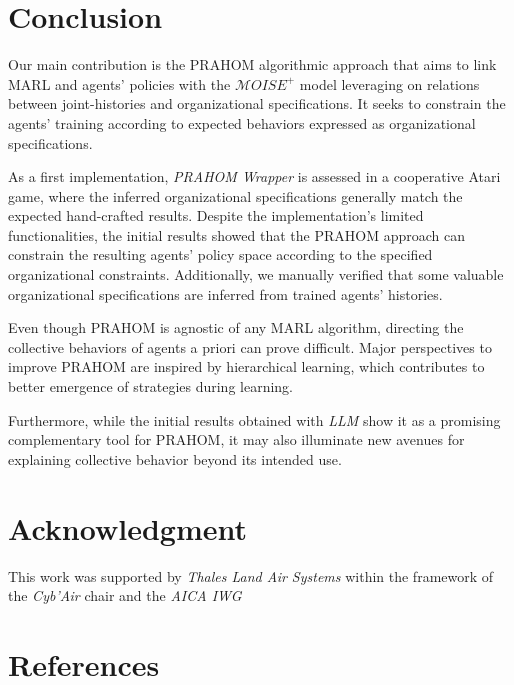 \documentclass[conference]{IEEEtran}
\newcounter{relation}
\begin{document}

\section{Conclusion}

Our main contribution is the PRAHOM algorithmic approach that aims to link MARL and agents' policies with the $\mathcal{M}OISE^+$ model leveraging on relations between joint-histories and organizational specifications. It seeks to constrain the agents' training according to expected behaviors expressed as organizational specifications.

As a first implementation, \emph{PRAHOM Wrapper} is assessed in a cooperative Atari game, where the inferred organizational specifications generally match the expected hand-crafted results. Despite the implementation's limited functionalities, the initial results showed that the PRAHOM approach can constrain the resulting agents' policy space according to the specified organizational constraints. Additionally, we manually verified that some valuable organizational specifications are inferred from trained agents' histories.

Even though PRAHOM is agnostic of any MARL algorithm, directing the collective behaviors of agents a priori can prove difficult. Major perspectives to improve PRAHOM are inspired by hierarchical learning, which contributes to better emergence of strategies during learning.

Furthermore, while the initial results obtained with \emph{LLM} show it as a promising complementary tool for PRAHOM, it may also illuminate new avenues for explaining collective behavior beyond its intended use.




\section*{Acknowledgment}

This work was supported by \emph{Thales Land Air Systems} within the framework of the \emph{Cyb'Air} chair and the \emph{AICA IWG}

\section*{References}

% 



\end{document}
